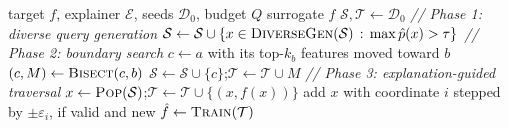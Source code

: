 \documentclass[sigconf,anonymous,review]{acmart}
\begin{document}
\begin{algorithm}[t]
\caption{Boundary-directed extraction with explainer
$\mathcal{E}\in\{\textsc{Shap},\textsc{Lime}\}$. Parameter values are given in
\S\ref{subsec:diverse}--\ref{subsec:traversal}.}
\label{alg:attack}
\begin{algorithmic}[1]
\Require target $f$, explainer $\mathcal{E}$, seeds $\mathcal{D}_0$, budget $Q$
\Ensure surrogate $\hat{f}$
\State $\mathcal{S}, \mathcal{T} \gets \mathcal{D}_0$
\Statex \textit{// Phase 1: diverse query generation}
\State $\mathcal{S} \gets \mathcal{S} \cup
       \{x \in \textsc{DiverseGen}(\mathcal{S}) \,:\, \max \hat{p}(x) > \tau\}$
\Statex \textit{// Phase 2: boundary search}
  \State $c \gets a$ with its top-$k_b$ features moved toward $b$
  \State $(c, M) \gets \textsc{Bisect}(c, b)$ 
  \State $\mathcal{S} \gets \mathcal{S} \cup \{c\}$;\quad $\mathcal{T} \gets \mathcal{T} \cup M$
\EndFor
\Statex \textit{// Phase 3: explanation-guided traversal}
  \State $x \gets \textsc{Pop}(\mathcal{S})$;\quad $\mathcal{T} \gets \mathcal{T} \cup \{(x, f(x))\}$
     \State add $x$ with coordinate $i$ stepped by $\pm\varepsilon_i$, if valid and new
  \EndFor
\EndWhile
\State \Return $\hat{f} \gets \textsc{Train}(\mathcal{T})$
\end{algorithmic}
\end{algorithm}
\end{document}
